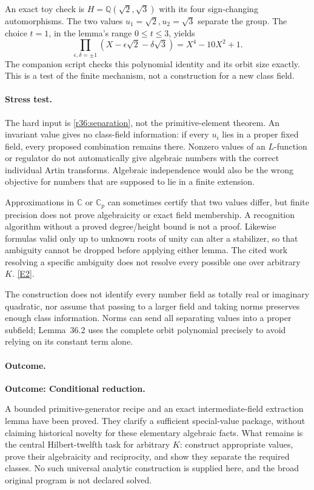 \documentclass[11pt,a4paper]{article}
\newcommand{\Q}{\mathbb{Q}}
\newcommand{\C}{\mathbb{C}}
\newcommand{\eref}[2]{\hyperlink{extra:#1:#2}{[E#2]}}
\numberwithin{equation}{section}
\begin{document}
An exact toy check is $H=\Q(\sqrt2,\sqrt3)$ with its four sign-changing
automorphisms. The two values $u_1=\sqrt2,u_2=\sqrt3$ separate the group.
The choice $t=1$, in the lemma's range $0\le t\le3$, yields
\[
 \prod_{\epsilon,\delta=\pm1}
 (X-\epsilon\sqrt2-\delta\sqrt3)=X^4-10X^2+1.
\]
The companion script checks this polynomial identity and its orbit size
exactly. This is a test of the finite mechanism, not a construction for a
new class field.

\paragraph{Stress test.}
The hard input is \eqref{r36:separation}, not the primitive-element theorem.
An invariant value gives no class-field information: if every $u_i$ lies in
a proper fixed field, every proposed combination remains there. Nonzero
values of an $L$-function or regulator do not automatically give algebraic
numbers with the correct individual Artin transforms. Algebraic independence
would also be the wrong objective for numbers that are supposed to lie in a
finite extension.

Approximations in $\C$ or $\C_p$ can sometimes certify that two values differ,
but finite precision does not prove algebraicity or exact field membership.
A recognition algorithm without a proved degree/height bound is not a proof.
Likewise formulas valid only up to unknown roots of unity can alter a
stabilizer, so that ambiguity cannot be dropped before applying either lemma.
The cited work resolving a specific ambiguity does not resolve every possible
one over arbitrary $K$. \eref{36}{2}.

The construction does not identify every number field as totally real or
imaginary quadratic, nor assume that passing to a larger field and taking
norms preserves enough class information. Norms can send all separating
values into a proper subfield; Lemma~36.2 uses the complete orbit polynomial
precisely to avoid relying on its constant term alone.

\paragraph{Outcome.}
\textbf{Outcome: Conditional reduction.}

A bounded primitive-generator recipe and an exact intermediate-field extraction
lemma have been proved. They clarify a sufficient special-value package,
without claiming historical novelty for these elementary algebraic facts.
What remains is the central Hilbert-twelfth task for arbitrary $K$: construct
appropriate values, prove their algebraicity and reciprocity, and show they
separate the required classes. No such universal analytic construction is
supplied here, and the broad original program is not declared solved.
\end{document}
